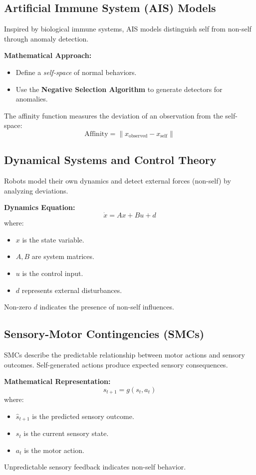 \subsection{Artificial Immune System (AIS) Models}
Inspired by biological immune systems, AIS models distinguish self from non-self through anomaly detection.

\textbf{Mathematical Approach:}
\begin{itemize}
    \item Define a \textit{self-space} of normal behaviors.
    \item Use the \textbf{Negative Selection Algorithm} to generate detectors for anomalies.
\end{itemize}

The affinity function measures the deviation of an observation from the self-space:
\begin{equation}
    \text{Affinity} = \| x_{\text{observed}} - x_{\text{self}} \|
\end{equation}

\subsection{Dynamical Systems and Control Theory}
Robots model their own dynamics and detect external forces (non-self) by analyzing deviations.

\textbf{Dynamics Equation:}
\begin{equation}
    \dot{x} = Ax + Bu + d
\end{equation}
where:
\begin{itemize}
    \item \( x \) is the state variable.
    \item \( A, B \) are system matrices.
    \item \( u \) is the control input.
    \item \( d \) represents external disturbances.
\end{itemize}
Non-zero \( d \) indicates the presence of non-self influences.

\subsection{Sensory-Motor Contingencies (SMCs)}
SMCs describe the predictable relationship between motor actions and sensory outcomes. Self-generated actions produce expected sensory consequences.

\textbf{Mathematical Representation:}
\begin{equation}
    \hat{s}_{t+1} = g(s_t, a_t)
\end{equation}
where:
\begin{itemize}
    \item \( \hat{s}_{t+1} \) is the predicted sensory outcome.
    \item \( s_t \) is the current sensory state.
    \item \( a_t \) is the motor action.
\end{itemize}
Unpredictable sensory feedback indicates non-self behavior.

